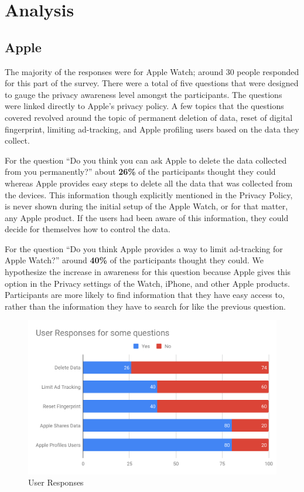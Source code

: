 \documentclass[sigconf]{acmart}
\begin{document}
\section{Analysis}

\subsection{Apple} \label{appleAnalysis}

The majority of the responses were for Apple Watch; around 30 people responded for this part of the survey. There were a total of five questions that were designed to gauge the privacy awareness level amongst the participants. The questions were linked directly to Apple’s privacy policy. A few topics that the questions covered revolved around the topic of permanent deletion of data, reset of digital fingerprint, limiting ad-tracking, and Apple profiling users based on the data they collect. 

For the question “Do you think you can ask Apple to delete the data collected from you permanently?” about \textbf{26\%} of the participants thought they could whereas Apple provides easy steps to delete all the data that was collected from the devices. This information though explicitly mentioned in the Privacy Policy, is never shown during the initial setup of the Apple Watch, or for that matter, any Apple product. If the users had been aware of this information, they could decide for themselves how to control the data. 

For the question “Do you think Apple provides a way to limit ad-tracking for Apple Watch?” around \textbf{40\%} of the participants thought they could. We hypothesize the increase in awareness for this question because Apple gives this option in the Privacy settings of the Watch, iPhone, and other Apple products. Participants are more likely to find information that they have easy access to, rather than the information they have to search for like the previous question. 

\begin{figure}[h]
  \centering
  \includegraphics[width=\linewidth]{00-chart.png}
  \caption{User Responses}
\end{figure}
\end{document}
